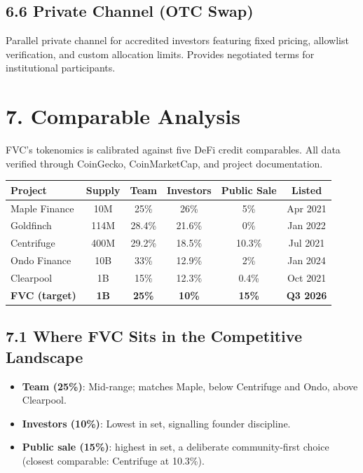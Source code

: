 \documentclass[
  paper=a4,
  ,captions=tableheading
]{scrartcl}
\providecommand{\tightlist}{%
  \setlength{\itemsep}{0pt}\setlength{\parskip}{0pt}}
\begin{document}
\subsection{6.6 Private Channel (OTC Swap)}\label{private-channel-otc-swap}

Parallel private channel for accredited investors featuring fixed pricing, allowlist verification, and custom allocation limits. Provides negotiated terms for institutional participants.

\section{7. Comparable Analysis}\label{comparable-analysis}

FVC's tokenomics is calibrated against five DeFi credit comparables. All data verified through CoinGecko, CoinMarketCap, and project documentation.

\begin{center}
\begin{tabular}{lccccc}
\toprule
\textbf{Project} & \textbf{Supply} & \textbf{Team} & \textbf{Investors} & \textbf{Public Sale} & \textbf{Listed} \\
\midrule
Maple Finance & 10M & 25\% & 26\% & 5\% & Apr 2021 \\
Goldfinch & 114M & 28.4\% & 21.6\% & 0\% & Jan 2022 \\
Centrifuge & 400M & 29.2\% & 18.5\% & 10.3\% & Jul 2021 \\
Ondo Finance & 10B & 33\% & 12.9\% & 2\% & Jan 2024 \\
Clearpool & 1B & 15\% & 12.3\% & 0.4\% & Oct 2021 \\
\midrule
\textbf{FVC (target)} & \textbf{1B} & \textbf{25\%} & \textbf{10\%} & \textbf{15\%} & \textbf{Q3 2026} \\
\bottomrule
\end{tabular}
\end{center}

\subsection{7.1 Where FVC Sits in the Competitive Landscape}\label{competitive-landscape}

\begin{itemize}
\tightlist
\item
  \textbf{Team (25\%)}: Mid-range; matches Maple, below Centrifuge and Ondo, above Clearpool.
\item
  \textbf{Investors (10\%)}: Lowest in set, signalling founder discipline.
\item
  \textbf{Public sale (15\%)}: highest in set, a deliberate community-first choice (closest comparable: Centrifuge at 10.3\%).
\end{itemize}
\end{document}
